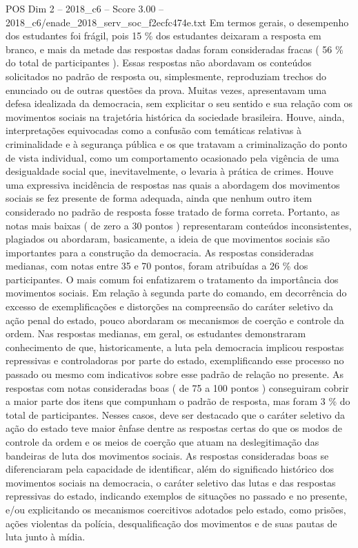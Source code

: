 \begin{textsample}{POS Dim 2 – 2018\_c6 – Score 3.00 – 2018\_c6/enade\_2018\_serv\_soc\_f2ecfc474e.txt}
Em termos gerais, o desempenho dos estudantes foi frágil, pois 15 \% dos estudantes deixaram a resposta em branco, e mais da metade das respostas dadas foram consideradas fracas ( 56 \% do total de participantes ).
Essas respostas não abordavam os conteúdos solicitados no padrão de resposta ou, simplesmente, reproduziam trechos do enunciado ou de outras questões da prova.
Muitas vezes, apresentavam uma defesa idealizada da democracia, sem explicitar o seu sentido e sua relação com os movimentos sociais na trajetória histórica da sociedade brasileira.
Houve, ainda, interpretações equivocadas como a confusão com temáticas relativas à criminalidade e à segurança pública e os que tratavam a criminalização do ponto de vista individual, como um comportamento ocasionado pela vigência de uma desigualdade social que, inevitavelmente, o levaria à prática de crimes.
Houve uma expressiva incidência de respostas nas quais a abordagem dos movimentos sociais se fez presente de forma adequada, ainda que nenhum outro item considerado no padrão de resposta fosse tratado de forma correta.
Portanto, as notas mais baixas ( de zero a 30 pontos ) representaram conteúdos inconsistentes, plagiados ou abordaram, basicamente, a ideia de que movimentos sociais são importantes para a construção da democracia.
As respostas consideradas medianas, com notas entre 35 e 70 pontos, foram atribuídas a 26 \% dos participantes.
O mais comum foi enfatizarem o tratamento da importância dos movimentos sociais.
Em relação à segunda parte do comando, em decorrência do excesso de exemplificações e distorções na compreensão do caráter seletivo da ação penal do estado, pouco abordaram os mecanismos de coerção e controle da ordem.
Nas respostas medianas, em geral, os estudantes demonstraram conhecimento de que, historicamente, a luta pela democracia implicou respostas repressivas e controladoras por parte do estado, exemplificando esse processo no passado ou mesmo com indicativos sobre esse padrão de relação no presente.
As respostas com notas consideradas boas ( de 75 a 100 pontos ) conseguiram cobrir a maior parte dos itens que compunham o padrão de resposta, mas foram 3 \% do total de participantes.
Nesses casos, deve ser destacado que o caráter seletivo da ação do estado teve maior ênfase dentre as respostas certas do que os modos de controle da ordem e os meios de coerção que atuam na deslegitimação das bandeiras de luta dos movimentos sociais.
As respostas consideradas boas se diferenciaram pela capacidade de identificar, além do significado histórico dos movimentos sociais na democracia, o caráter seletivo das lutas e das respostas repressivas do estado, indicando exemplos de situações no passado e no presente, e/ou explicitando os mecanismos coercitivos adotados pelo estado, como prisões, ações violentas da polícia, desqualificação dos movimentos e de suas pautas de luta junto à mídia.

\end{textsample}
